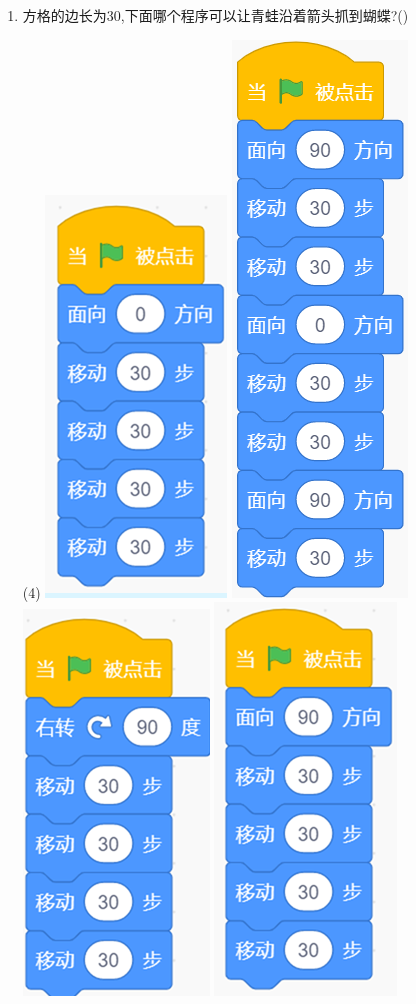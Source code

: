 \documentclass[10.5pt, a4paper]{article}
\begin{document}
\begin{enumerate}
    \newpage
        \item 方格的边长为30,下面哪个程序可以让青蛙沿着箭头抓到蝴蝶?(\qquad)
        \begin{tasks}(4)
            \task \includegraphics[width=.1\textwidth]{25a.png}
            \task \includegraphics[width=.08\textwidth]{25b.png}
            \task \includegraphics[width=.12\textwidth]{25c.png}
            \task \includegraphics[width=.12\textwidth]{25d.png}
        \end{tasks}
    \end{enumerate}
\end{document}
